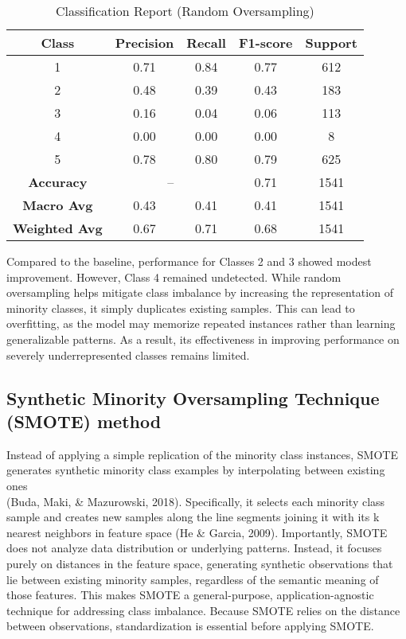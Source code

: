 \begin{table}[!h]
\centering
\caption{Classification Report (Random Oversampling)}
\label{tab:ro_imbalanced}
\begin{tabular}{|c|c|c|c|c|}
\hline
\textbf{Class} & \textbf{Precision} & \textbf{Recall} & \textbf{F1-score} & \textbf{Support} \\
\hline
1 & 0.71 & 0.84 & 0.77 & 612 \\
2 & 0.48 & 0.39 & 0.43 & 183 \\
3 & 0.16 & 0.04 & 0.06 & 113 \\
4 & 0.00 & 0.00 & 0.00 & 8 \\
5 & 0.78 & 0.80 & 0.79 & 625 \\
\hline
\textbf{Accuracy} & \multicolumn{2}{|c|}{--} & 0.71 & 1541 \\
\hline
\textbf{Macro Avg} & 0.43 & 0.41 & 0.41 & 1541 \\
\textbf{Weighted Avg} & 0.67 & 0.71 & 0.68 & 1541 \\
\hline
\end{tabular}
\end{table}

Compared to the baseline, performance for Classes 2 and 3 showed modest improvement. 
However, Class 4 remained undetected. While random oversampling helps mitigate class imbalance by increasing the representation 
of minority classes, it simply duplicates existing samples. This can lead to overfitting, as the model may memorize repeated instances rather
than learning generalizable patterns. As a result, its effectiveness in improving performance on severely underrepresented classes remains limited.

\subsection{Synthetic Minority Oversampling Technique (SMOTE) method}

Instead of applying a simple replication of the minority class instances,
SMOTE generates synthetic minority class examples by interpolating between existing ones\\(Buda, Maki, \& Mazurowski, 2018).
Specifically, it selects each minority class sample and creates new samples along the line segments joining it with
its k nearest neighbors in feature space (He \& Garcia, 2009). Importantly, SMOTE does not analyze data distribution or
underlying patterns. Instead, it focuses purely on distances in the feature space, generating synthetic observations 
that lie between existing minority samples, regardless of the semantic meaning of those features.
This makes SMOTE a general-purpose, application-agnostic technique for addressing class imbalance.
Because SMOTE relies on the distance between observations, standardization is essential before applying SMOTE. 


